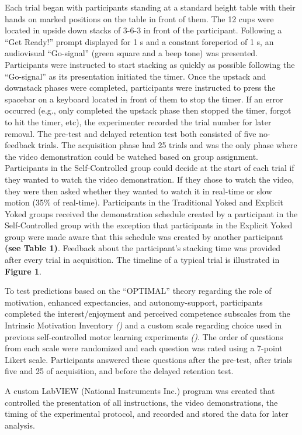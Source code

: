 \documentclass[
  english,
  jou]{apa7}
\begin{document}
Each trial began with participants standing at a standard height table with their hands on marked positions on the table in front of them. The 12 cups were located in upside down stacks of 3-6-3 in front of the participant. Following a ``Get Ready!'' prompt displayed for 1 s and a constant foreperiod of 1 s, an audiovisual ``Go-signal'' (green square and a beep tone) was presented. Participants were instructed to start stacking as quickly as possible following the ``Go-signal'' as its presentation initiated the timer. Once the upstack and downstack phases were completed, participants were instructed to press the spacebar on a keyboard located in front of them to stop the timer. If an error occurred (e.g., only completed the upstack phase then stopped the timer, forgot to hit the timer, etc), the experimenter recorded the trial number for later removal. The pre-test and delayed retention test both consisted of five no-feedback trials. The acquisition phase had 25 trials and was the only phase where the video demonstration could be watched based on group assignment. Participants in the Self-Controlled group could decide at the start of each trial if they wanted to watch the video demonstration. If they chose to watch the video, they were then asked whether they wanted to watch it in real-time or slow motion (35\% of real-time). Participants in the Traditional Yoked and Explicit Yoked groups received the demonstration schedule created by a participant in the Self-Controlled group with the exception that participants in the Explicit Yoked group were made aware that this schedule was created by another participant \textbf{(see Table 1)}. Feedback about the participant's stacking time was provided after every trial in acquisition. The timeline of a typical trial is illustrated in \textbf{Figure 1}.

To test predictions based on the ``OPTIMAL'' theory regarding the role of motivation, enhanced expectancies, and autonomy-support, participants completed the interest/enjoyment and perceived competence subscales from the Intrinsic Motivation Inventory \emph{()} and a custom scale regarding choice used in previous self-controlled motor learning experiments \emph{()}. The order of questions from each scale were randomized and each question was rated using a 7-point Likert scale. Participants answered these questions after the pre-test, after trials five and 25 of acquisition, and before the delayed retention test.

A custom LabVIEW (National Instruments Inc.) program was created that controlled the presentation of all instructions, the video demonstrations, the timing of the experimental protocol, and recorded and stored the data for later analysis.
\end{document}
